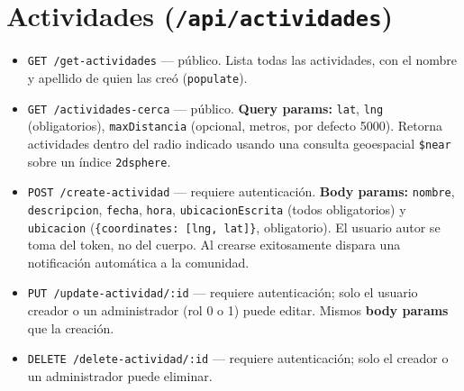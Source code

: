 \section{Actividades (\texttt{/api/actividades})}
\begin{itemize}
    \item \texttt{GET /get-actividades} — público. Lista todas las actividades, con el nombre y apellido de quien las creó (\texttt{populate}).
    \item \texttt{GET /actividades-cerca} — público. \textbf{Query params:} \texttt{lat}, \texttt{lng} (obligatorios), \texttt{maxDistancia} (opcional, metros, por defecto 5000). Retorna actividades dentro del radio indicado usando una consulta geoespacial \texttt{\$near} sobre un índice \texttt{2dsphere}.
    \item \texttt{POST /create-actividad} — requiere autenticación. \textbf{Body params:} \texttt{nombre}, \texttt{descripcion}, \texttt{fecha}, \texttt{hora}, \texttt{ubicacionEscrita} (todos obligatorios) y \texttt{ubicacion} (\texttt{\{coordinates: [lng, lat]\}}, obligatorio). El usuario autor se toma del token, no del cuerpo. Al crearse exitosamente dispara una notificación automática a la comunidad.
    \item \texttt{PUT /update-actividad/:id} — requiere autenticación; solo el usuario creador o un administrador (rol 0 o 1) puede editar. Mismos \textbf{body params} que la creación.
    \item \texttt{DELETE /delete-actividad/:id} — requiere autenticación; solo el creador o un administrador puede eliminar.
\end{itemize}

